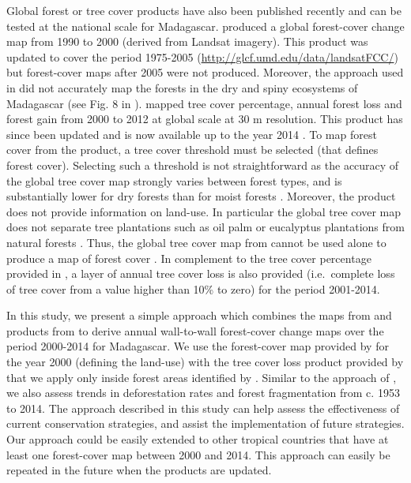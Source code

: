 \documentclass[a4paper, 12pt, leqno]{article} %
\begin{document}
Global forest or tree cover products have also been published recently
and can be tested at the national scale for
Madagascar. \citep{Kim2014} produced a global forest-cover change map
from 1990 to 2000 (derived from Landsat imagery). This product was
updated to cover the period 1975-2005
(\url{http://glcf.umd.edu/data/landsatFCC/}) but forest-cover maps
after 2005 were not produced. Moreover, the approach used in
\citet{Kim2014} did not accurately map the forests in the dry and
spiny ecosystems of Madagascar (see Fig. 8 in \citet{Kim2014}).
\citet{Hansen2013} mapped tree cover percentage, annual forest loss
and forest gain from 2000 to 2012 at global scale at 30 m
resolution. This product has since been updated and is now available
up to the year 2014 \citep{Hansen2013}. To map forest cover from the
\citet{Hansen2013} product, a tree cover threshold must be selected
(that defines forest cover). Selecting such a threshold is not
straightforward as the accuracy of the global tree cover map strongly
varies between forest types, and is substantially lower for dry
forests than for moist forests \citep{Bastin2017}. Moreover, the
\citet{Hansen2013} product does not provide information on
land-use. In particular the global tree cover map does not separate
tree plantations such as oil palm or eucalyptus plantations from
natural forests \citep{Tropek2014}. Thus, the global tree cover map
from \citet{Hansen2013} cannot be used alone to produce a map of
forest cover \citep{Tyukavina2017}. In complement to the tree cover
percentage provided in \citet{Hansen2013}, a layer of annual tree
cover loss is also provided (i.e.~complete loss of tree cover from a
value higher than 10\% to zero) for the period 2001-2014.

In this study, we present a simple approach which combines the maps
from \citet{Harper2007} and products from \citet{Hansen2013} to derive
annual wall-to-wall forest-cover change maps over the period 2000-2014
for Madagascar. We use the forest-cover map provided by
\citet{Harper2007} for the year 2000 (defining the land-use) with the
tree cover loss product provided by \citet{Hansen2013} that we apply
only inside forest areas identified by \citet{Harper2007}. Similar to
the approach of \citet{Harper2007}, we also assess trends in
deforestation rates and forest fragmentation from c. 1953 to 2014. The
approach described in this study can help assess the effectiveness of
current conservation strategies, and assist the implementation of
future strategies. Our approach could be easily extended to other
tropical countries that have at least one forest-cover map between
2000 and 2014. This approach can easily be repeated in the future when
the \citet{Hansen2013} products are updated.
\end{document}
